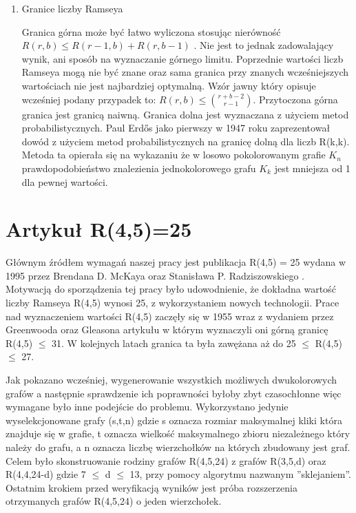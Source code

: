 \begin{enumerate}
\item Granice liczby Ramseya \hfill \par

Granica górna może być łatwo wyliczona stosując nierówność $R(r,b) \le R(r-1,b)+R(r,b-1)$ \cite{graniceupdown}. Nie jest to jednak zadowalający wynik, ani sposób na wyznaczanie górnego limitu. Poprzednie wartości liczb Ramseya mogą nie być znane oraz sama granica przy znanych wcześniejszych wartościach nie jest najbardziej optymalną. Wzór jawny który opisuje wcześniej podany przypadek to: $R(r,b) \le {r+b-2\choose r-1}$. Przytoczona górna granica jest granicą naiwną. Granica dolna jest wyznaczana z użyciem metod probabilistycznych. Paul Erdős jako pierwszy w 1947 roku zaprezentował dowód z użyciem metod probabilistycznych na granicę dolną dla liczb R(k,k)\cite{erdogranica, graniceupdown}. Metoda ta opierała się na wykazaniu że w losowo pokolorowanym grafie $\mathit{K}_{n}$ prawdopodobieństwo znalezienia jednokolorowego grafu $\mathit{K}_{k}$ jest mniejsza od 1 dla pewnej wartości.

\end{enumerate}

\section{Artykuł R(4,5)=25}


Głównym źródłem wymagań naszej pracy jest publikacja R(4,5) = 25 wydana w 1995 przez Brendana D. McKaya oraz Stanisława P. Radziszowskiego  \cite{mainpaper}. Motywacją do sporządzenia tej pracy było udowodnienie, że dokładna wartość liczby Ramseya R(4,5) wynosi 25, z wykorzystaniem nowych technologii. Prace nad wyznaczeniem wartości R(4,5) zaczęły się w 1955 wraz z wydaniem przez Greenwooda oraz Gleasona artykułu w którym wyznaczyli oni górną granicę R(4,5) $\leq$ 31. W kolejnych latach granica ta była zawężana aż do 25 $\leq$ R(4,5) $\leq$ 27.\par
Jak pokazano wcześniej, wygenerowanie wszystkich możliwych dwukolorowych grafów a następnie sprawdzenie ich poprawności byłoby zbyt czasochłonne więc wymagane było inne podejście do problemu. Wykorzystano jedynie wyselekcjonowane grafy (s,t,n) gdzie s oznacza rozmiar maksymalnej kliki która znajduje się w grafie, t oznacza wielkość maksymalnego zbioru niezależnego który należy do grafu, a n oznacza liczbę wierzchołków na których zbudowany jest graf. Celem było skonstruowanie rodziny grafów R(4,5,24) z grafów R(3,5,d) oraz R(4,4,24-d) gdzie 7 $\leq$ d $\leq$ 13, przy pomocy algorytmu nazwanym ''sklejaniem''. Ostatnim krokiem przed weryfikacją wyników jest próba rozszerzenia otrzymanych grafów R(4,5,24) o jeden wierzchołek.

